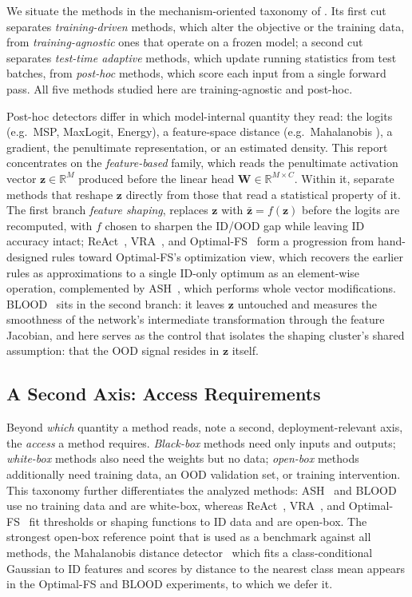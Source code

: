 \documentclass[a4paper]{article}
\begin{document}
We situate the methods in the mechanism-oriented taxonomy of \citet{survey}. Its
first cut separates \emph{training-driven} methods, which alter the objective or the
training data, from \emph{training-agnostic} ones that operate on a frozen model; a
second cut separates \emph{test-time adaptive} methods, which update running
statistics from test batches, from \emph{post-hoc} methods, which score each input
from a single forward pass. All five methods studied here are training-agnostic and
post-hoc.

Post-hoc detectors differ in which model-internal quantity they read: the logits
(e.g.\ MSP\cite{MSP}, MaxLogit, Energy\cite{energy}), a feature-space distance (e.g.\ Mahalanobis \cite{mahalanobis}), a
gradient, the penultimate representation, or an estimated density. This report
concentrates on the \emph{feature-based} family, which reads the penultimate
activation vector $\mathbf{z} \in \mathbb{R}^{M}$ produced before the linear head
$\mathbf{W} \in \mathbb{R}^{M \times C}$. Within it, \citet{survey} separate methods
that reshape $\mathbf{z}$ directly from those that read a statistical property of it.
The first branch \emph{feature shaping}, replaces $\mathbf{z}$ with $ \bar{\mathbf{z}}=f(\mathbf{z})$
before the logits are recomputed, with $f$ chosen to sharpen the ID/OOD gap while
leaving ID accuracy intact; ReAct~\cite{react}, VRA~\cite{vra}, and
Optimal-FS~\cite{optimalfs} form a progression from hand-designed rules toward
Optimal-FS's optimization view, which recovers the earlier rules as approximations to
a single ID-only optimum as an element-wise operation, complemented by ASH~\cite{ash}, which performs whole vector modifications. BLOOD~\cite{blood} sits in the second branch: it leaves
$\mathbf{z}$ untouched and measures the smoothness of the network's intermediate
transformation through the feature Jacobian, and here serves as the control that
isolates the shaping cluster's shared assumption: that the OOD signal resides in
$\mathbf{z}$ itself.

\subsection{A Second Axis: Access Requirements}
\label{subsec:access}

Beyond \emph{which} quantity a method reads, \citet{blood} note a second,
deployment-relevant axis, the \emph{access} a method requires. \emph{Black-box}
methods need only inputs and outputs; \emph{white-box} methods also need the weights
but no data; \emph{open-box} methods additionally need training data, an OOD
validation set, or training intervention. This taxonomy further differentiates the analyzed methods:
ASH~\cite{ash} and BLOOD~\cite{blood} use no training data and are white-box, whereas
ReAct~\cite{react}, VRA~\cite{vra}, and Optimal-FS~\cite{optimalfs} fit thresholds or
shaping functions to ID data and are open-box. The strongest open-box reference point that is used as a benchmark against all methods, the Mahalanobis
distance detector~\cite{mahalanobis} which fits a class-conditional Gaussian to ID
features and scores by distance to the nearest class mean appears in the Optimal-FS and BLOOD
experiments, to which we defer it.
\end{document}
